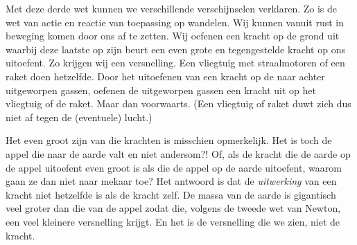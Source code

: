 \documentclass{ximera}
\begin{document}
	Met deze derde wet kunnen we verschillende verschijnselen verklaren. Zo is de wet van actie en reactie van toepassing op wandelen. Wij kunnen vanuit rust in beweging komen door ons af te zetten. Wij oefenen een kracht op de grond uit waarbij deze laatste op zijn beurt een even grote en tegengestelde kracht op ons uitoefent. Zo krijgen wij een versnelling. Een vliegtuig met straalmotoren of een raket doen hetzelfde. Door het uitoefenen van een kracht op de naar achter uitgeworpen gassen, oefenen de uitgeworpen gassen een kracht uit op het vliegtuig of de raket. Maar dan voorwaarts. (Een vliegtuig of raket duwt zich dus niet af tegen de (eventuele) lucht.)
	
	Het even groot zijn van die krachten is misschien opmerkelijk. Het is toch de appel die naar de aarde valt en niet andersom?! Of, als de kracht die de aarde op de appel uitoefent even groot is als die de appel op de aarde uitoefent, waarom gaan ze dan niet naar mekaar toe? Het antwoord is dat de \emph{uitwerking} van een kracht niet hetzelfde is als de kracht zelf. De massa van de aarde is gigantisch veel groter dan die van de appel zodat die, volgens de tweede wet van Newton, een veel kleinere versnelling krijgt. En het is de versnelling die we zien, niet de kracht.
	
	
\end{document}
